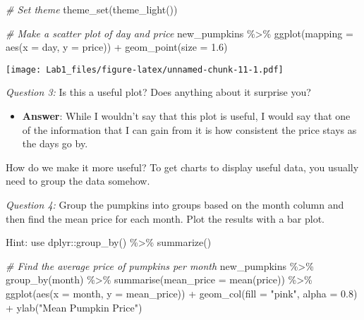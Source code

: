 \documentclass[
]{article}
\newenvironment{Shaded}{\begin{snugshade}}{\end{snugshade}}
\newcommand{\AttributeTok}[1]{\textcolor[rgb]{0.77,0.63,0.00}{#1}}
\newcommand{\CommentTok}[1]{\textcolor[rgb]{0.56,0.35,0.01}{\textit{#1}}}
\newcommand{\FloatTok}[1]{\textcolor[rgb]{0.00,0.00,0.81}{#1}}
\newcommand{\FunctionTok}[1]{\textcolor[rgb]{0.00,0.00,0.00}{#1}}
\newcommand{\NormalTok}[1]{#1}
\newcommand{\SpecialCharTok}[1]{\textcolor[rgb]{0.00,0.00,0.00}{#1}}
\newcommand{\StringTok}[1]{\textcolor[rgb]{0.31,0.60,0.02}{#1}}
\providecommand{\tightlist}{%
  \setlength{\itemsep}{0pt}\setlength{\parskip}{0pt}}
\begin{document}
\begin{Shaded}
\begin{Highlighting}[]
\CommentTok{\# Set theme}
\FunctionTok{theme\_set}\NormalTok{(}\FunctionTok{theme\_light}\NormalTok{())}

\CommentTok{\# Make a scatter plot of day and price}
\NormalTok{new\_pumpkins }\SpecialCharTok{\%\textgreater{}\%} 
  \FunctionTok{ggplot}\NormalTok{(}\AttributeTok{mapping =} \FunctionTok{aes}\NormalTok{(}\AttributeTok{x =}\NormalTok{ day, }\AttributeTok{y =}\NormalTok{ price)) }\SpecialCharTok{+}
  \FunctionTok{geom\_point}\NormalTok{(}\AttributeTok{size =} \FloatTok{1.6}\NormalTok{)}
\end{Highlighting}
\end{Shaded}

\texttt{[image: Lab1\_files/figure-latex/unnamed-chunk-11-1.pdf]}

\emph{Question 3:} Is this a useful plot? Does anything about it
surprise you?

\begin{itemize}
\tightlist
\item
  \textbf{Answer}: While I wouldn't say that this plot is useful, I
  would say that one of the information that I can gain from it is how
  consistent the price stays as the days go by.
\end{itemize}

How do we make it more useful? To get charts to display useful data, you
usually need to group the data somehow.

\emph{Question 4:} Group the pumpkins into groups based on the month
column and then find the mean price for each month. Plot the results
with a bar plot.

Hint: use dplyr::group\_by() \%\textgreater\% summarize()

\begin{Shaded}
\begin{Highlighting}[]
\CommentTok{\# Find the average price of pumpkins per month}
\NormalTok{new\_pumpkins }\SpecialCharTok{\%\textgreater{}\%} 
  \FunctionTok{group\_by}\NormalTok{(month) }\SpecialCharTok{\%\textgreater{}\%} 
  \FunctionTok{summarise}\NormalTok{(}\AttributeTok{mean\_price =} \FunctionTok{mean}\NormalTok{(price)) }\SpecialCharTok{\%\textgreater{}\%} 
  \FunctionTok{ggplot}\NormalTok{(}\FunctionTok{aes}\NormalTok{(}\AttributeTok{x =}\NormalTok{ month, }\AttributeTok{y =}\NormalTok{ mean\_price)) }\SpecialCharTok{+}
  \FunctionTok{geom\_col}\NormalTok{(}\AttributeTok{fill =} \StringTok{"pink"}\NormalTok{, }\AttributeTok{alpha =} \FloatTok{0.8}\NormalTok{) }\SpecialCharTok{+}
  \FunctionTok{ylab}\NormalTok{(}\StringTok{"Mean Pumpkin Price"}\NormalTok{)}
\end{Highlighting}
\end{Shaded}
\end{document}
